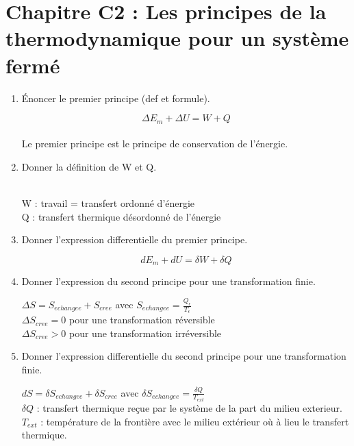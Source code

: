\section*{\centering Chapitre C2 : Les principes de la thermodynamique pour un système fermé} 
\begin{enumerate}[label=\arabic{enumi} - , left=0pt, itemsep=1em] %
    \item Énoncer le premier principe (def et formule). \par
    \begin{solution}
     \[ \Delta E_m + \Delta U = W + Q\]\\
     Le premier principe est le principe de conservation de l'énergie.
    \end{solution}

    \item Donner la définition de W et Q. \par
    \begin{solution}\\
        W : travail = transfert ordonné d'énergie \\
        Q : transfert thermique désordonné de l'énergie
    \end{solution}

    \item Donner l'expression differentielle du premier principe. \par
    \begin{solution}
        \[ dE_m + dU = \delta W + \delta Q \]
    \end{solution}

    \item Donner l'expression du second principe pour une transformation finie. \par
    \begin{solution}
        $\Delta S = S_{echangee} + S_{cree}$ avec $ S_{echangee} = \frac{Q_{\epsilon}}{T_{\epsilon}}$ \\
        $\Delta S_{cree} = 0$ pour une transformation réversible \\
        $\Delta S_{cree} > 0$ pour une transformation irréversible

    \end{solution}

    \item Donner l'expression differentielle du second principe pour une transformation finie. \par
    \begin{solution}
        $ dS = \delta S_{echangee} + \delta S_{cree}$ avec $ \delta S_{echangee} = \frac{\delta Q}{T_{ext}}$ \\
        $\delta Q$ : transfert thermique reçue par le système de la part du milieu exterieur. \\
        $T_{ext}$ : température de la frontière avec le milieu extérieur où à lieu le transfert thermique.
    \end{solution}


\end{enumerate}
